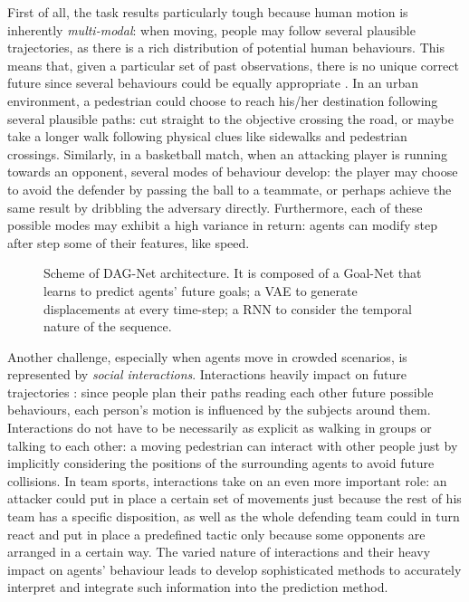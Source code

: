 \documentclass[10pt,a4paper,conference]{IEEEtran}
\begin{document}
First of all, the task results particularly tough because human motion is inherently \textit{multi-modal}: when moving, people may follow several plausible trajectories, as there is a rich distribution of potential human behaviours. This means that, given a particular set of past observations, there is no unique correct future since several behaviours could be equally appropriate \cite{sgan, social-bigat}. In an urban environment, a pedestrian could choose to reach his/her destination following several plausible paths: cut straight to the objective crossing the road, or maybe take a longer walk following physical clues like sidewalks and pedestrian crossings. Similarly, in a basketball match, when an attacking player is running towards an opponent, several modes of behaviour develop: the player may choose to avoid the defender by passing the ball to a teammate, or perhaps achieve the same result by dribbling the adversary directly. Furthermore, each of these possible modes may exhibit a high variance in return: agents can modify step after step some of their features, like speed.

\begin{figure}[!t]
    \caption{Scheme of DAG-Net architecture. It is composed of a Goal-Net that learns to predict agents' future goals; a VAE to generate displacements at every time-step; a RNN to consider the temporal nature of the sequence.}
    \label{fig:model}
\end{figure}

Another challenge, especially when agents move in crowded scenarios, is represented by \textit{social interactions}. Interactions heavily impact on future trajectories \cite{sgan, slstm}: since people plan their paths reading each other future possible behaviours, each person's motion is influenced by the subjects around them. Interactions do not have to be necessarily as explicit as walking in groups or talking to each other: a moving pedestrian can interact with other people just by implicitly considering the positions of the surrounding agents to avoid future collisions. In team sports, interactions take on an even more important role: an attacker could put in place a certain set of movements just because the rest of his team has a specific disposition, as well as the whole defending team could in turn react and put in place a predefined tactic only because some opponents are arranged in a certain way. The varied nature of interactions and their heavy impact on agents' behaviour leads to develop sophisticated methods to accurately interpret and integrate such information into the prediction method.
\end{document}
